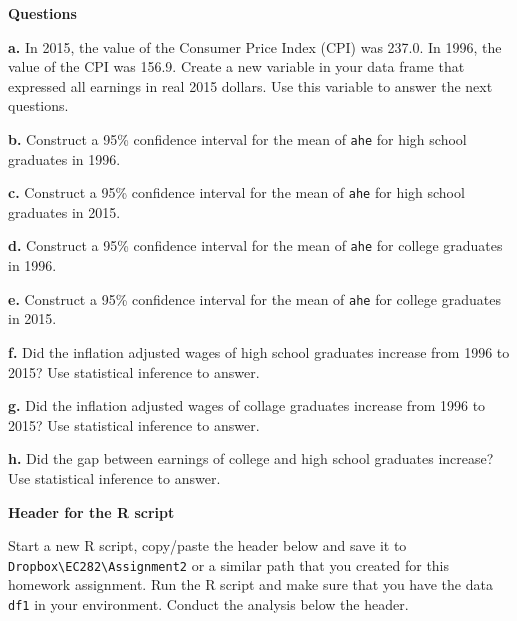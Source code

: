\documentclass[
]{book}
\begin{document}
\textbf{Questions}

\textbf{a.} In 2015, the value of the Consumer Price Index (CPI) was 237.0. In 1996, the value of the CPI was 156.9. Create a new variable in your data frame that expressed all earnings in real 2015 dollars. Use this variable to answer the next questions.

\textbf{b.} Construct a 95\% confidence interval for the mean of \texttt{ahe} for high school graduates in 1996.

\textbf{c.} Construct a 95\% confidence interval for the mean of \texttt{ahe} for high school graduates in 2015.

\textbf{d.} Construct a 95\% confidence interval for the mean of \texttt{ahe} for college graduates in 1996.

\textbf{e.} Construct a 95\% confidence interval for the mean of \texttt{ahe} for college graduates in 2015.

\textbf{f.} Did the inflation adjusted wages of high school graduates increase from 1996 to 2015? Use statistical inference to answer.

\textbf{g.} Did the inflation adjusted wages of collage graduates increase from 1996 to 2015? Use statistical inference to answer.

\textbf{h.} Did the gap between earnings of college and high school graduates increase? Use statistical inference to answer.

\textbf{Header for the R script}

Start a new R script, copy/paste the header below and save it to \texttt{Dropbox\textbackslash{}EC282\textbackslash{}Assignment2} or a similar path that you created for this homework assignment. Run the R script and make sure that you have the data \texttt{df1} in your environment. Conduct the analysis below the header.
\end{document}
